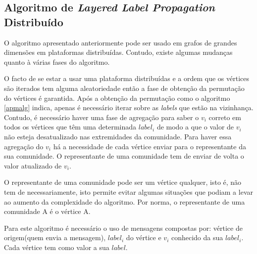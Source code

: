\subsection{Algoritmo de \textit{Layered Label Propagation} Distribuído}

O algoritmo apresentado anteriormente pode ser usado em grafos de grandes
dimensões em plataformas distribuídas. Contudo, existe algumas mudanças quanto 
à várias fases do algoritmo. 

  O facto de se estar a usar uma plataforma distribuídas e a ordem que os 
vértices são iterados tem alguma aleatoriedade então a fase de obtenção da 
permutação do vértices é garantida. Após a obtenção da permutação como o 
algoritmo \ref{apmalg} indica, apenas é necessário iterar sobre as 
\textit{labels} que estão na vizinhança. Contudo, é necessário haver uma fase 
de agregação para saber o $v_i$ correto em todos os vértices que têm uma 
determinada $label_i$ de modo a que o valor de $v_i$ não esteja desatualizado 
nas extremidades da comunidade. Para haver essa agregação do $v_i$ há a 
necessidade de cada vértice enviar para o representante da sua comunidade. O 
representante de uma comunidade tem de enviar de volta o valor atualizado de 
$v_i$.

O representante de uma comunidade pode ser um vértice qualquer, isto é, não 
tem de necessariamente, isto permite evitar algumas situações que 
podiam a levar ao aumento da complexidade do algoritmo. Por norma, o 
representante de uma comunidade A é o vértice A.

Para este algoritmo é necessário o uso de mensagens compostas por: vértice de 
origem(quem envia a mensagem), $label_i$ do vértice e $v_i$ conhecido da sua 
$label_i$. Cada vértice tem como valor a sua $label$.

